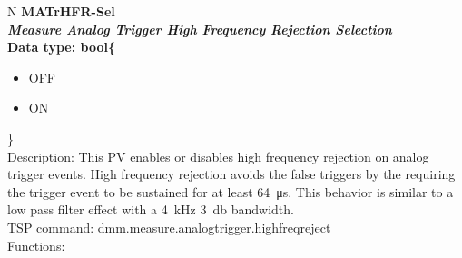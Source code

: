 \documentclass[openany]{article}
\begin{document}
		\begin{tabular}{N}
			\hline
			\bfseries MATrHFR-Sel\label{pv:matrhfr-sel} \\ \hline
			\emph{Measure Analog Trigger High Frequency Rejection Selection} \\
			Data type: bool\{\begin{itemize}[noitemsep]
				\small
				\item[] OFF
				\item[] ON
			\end{itemize}\} \\
			Description: This PV enables or disables high frequency rejection on analog trigger events. High frequency rejection avoids the false triggers by the requiring the trigger event to be sustained for at least \SI{64}{\micro\second}. This behavior is similar to a low pass filter effect with a \SI{4}{\kilo\hertz} \SI{3}{\decibel} bandwidth. \\
			TSP command: dmm.measure.analogtrigger.highfreqreject \\
			Functions: \\
			\arrayrulecolor{\FuncTableBorderColor}

		\end{tabular}
\end{document}
